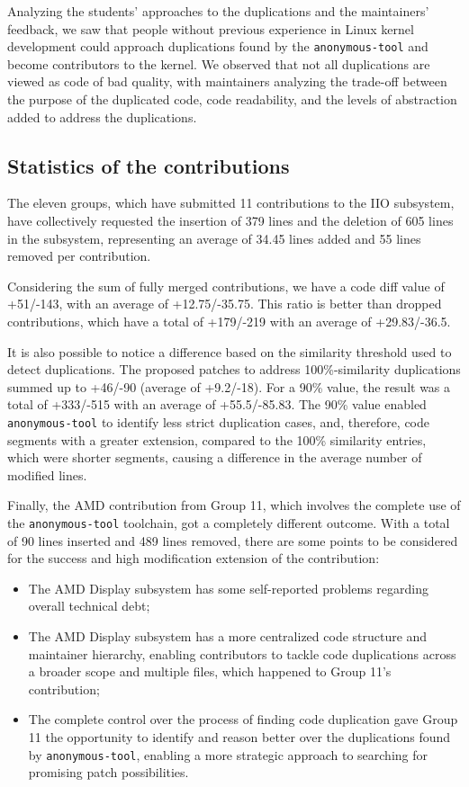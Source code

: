 \documentclass[10pt,conference]{IEEEtran}
\begin{document}
Analyzing the students' approaches to the duplications and the maintainers' feedback, we saw that people without previous experience in Linux kernel development could approach duplications found by the \texttt{anonymous-tool} and become contributors to the kernel. We observed that not all duplications 
are viewed as code of bad quality, with maintainers analyzing the trade-off between the purpose of the duplicated code, code readability, and the levels of abstraction added to address the duplications.

\subsection{Statistics of the contributions}

The eleven groups, which have submitted 11 contributions to the IIO subsystem, have collectively requested the insertion of 379 lines and the deletion of 605 lines in the subsystem, representing an average of 34.45 lines added and 55 lines removed per contribution.

Considering the sum of fully merged contributions, we have a code diff value of +51/-143, with an average of +12.75/-35.75. This ratio is better than dropped contributions, which have a total of +179/-219 with an average of +29.83/-36.5.

It is also possible to notice a difference based on the similarity threshold used to detect duplications. The proposed patches to address 100\%-similarity duplications summed up to +46/-90 (average of +9.2/-18). For a 90\% value, the result was a total of +333/-515 with an average of +55.5/-85.83. The 90\% value enabled \texttt{anonymous-tool} to identify less strict duplication cases, and, therefore, code segments with a greater extension, compared to the 100\% similarity entries, which were shorter segments, causing a difference in the average number of modified lines.

Finally, the AMD contribution from Group 11, which involves the complete use of the \texttt{anonymous-tool} toolchain, got a completely different outcome. With a total of 90 lines inserted and 489 lines removed, there are some points to be considered for the success and high modification extension of the contribution:

\begin{itemize}
    \item The AMD Display subsystem has some self-reported problems regarding overall technical debt;
    \item The AMD Display subsystem has a more centralized code structure and maintainer hierarchy, enabling contributors to tackle code duplications across a broader scope and multiple files, which happened to Group 11's contribution;
    \item The complete control over the process of finding code duplication gave Group 11 the opportunity to identify and reason better over the duplications found by \texttt{anonymous-tool}, enabling a more strategic approach to searching for promising patch possibilities. 
\end{itemize}
\end{document}
